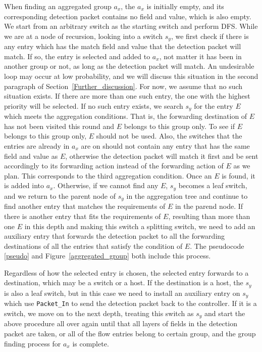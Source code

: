 When finding an aggregated group $a_x$, the $a_x$ is initially empty, and its corresponding detection packet contains no field and value, which is also empty. We start from an arbitrary switch as the starting switch and perform DFS. While we are at a node of recursion, looking into a switch $s_y$, we first check if there is any entry which has the match field and value that the detection packet will match. If so, the entry is selected and added to $a_x$, not matter it has been in another group or not, as long as the detection packet will match. An undesirable loop may occur at low probability, and we will discuss this situation in the second paragraph of Section~\ref{Further_discussion}. For now, we assume that no such situation exists. If there are more than one such entry, the one with the highest priority will be selected. If no such entry exists, we search $s_y$ for the entry $E$ which meets the aggregation conditions. That is, the forwarding destination of $E$ has not been visited this round and $E$ belongs to this group only. To see if $E$ belongs to this group only, $E$ should not be used. Also, the switches that the entries are already in $a_x$ are on should not contain any entry that has the same field and value as $E$, otherwise the detection packet will match it first and be sent accordingly to its forwarding action instead of the forwarding action of $E$ as we plan. This corresponds to the third aggregation condition. Once an $E$ is found, it is added into $a_x$. Otherwise, if we cannot find any $E$, $s_y$ becomes a leaf switch, and we return to the parent node of $s_y$ in the aggregation tree and continue to find another entry that matches the requirements of $E$ in the parend node. If there is another entry that fits the requirements of $E$, resulting than more than one $E$ in this depth and making this switch a splitting switch, we need to add an auxiliary entry that forwards the detection packet to all the forwarding destinations of all the entries that satisfy the condition of $E$. The pseudocode \ref{pseudo} and Figure~\ref{aggregated_group} both include this process.

Regardless of how the selected entry is chosen, the selected entry forwards to a destination, which may be a switch or a host. If the destination is a host, the $s_y$ is also a leaf switch, but in this case we need to install an auxiliary entry on $s_y$ which use \texttt{Packet\_In} to send the detection packet back to the controller. If it is a switch, we move on to the next depth, treating this switch as $s_y$ and start the above procedure all over again until that all layers of fields in the detection packet are taken, or all of the flow entries belong to certain group, and the group finding process for $a_x$ is complete.

